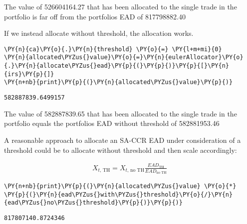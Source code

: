     The value of 526604164.27 that has been allocated to the single trade in
the portfolio is far off from the portfolios EAD of 817798882.40

    
    If we instead allocate without threshold, the allocation works.

    \begin{tcolorbox}[breakable, size=fbox, boxrule=1pt, pad at break*=1mm,colback=cellbackground, colframe=cellborder]
\begin{Verbatim}[commandchars=\\\{\}]
\PY{n}{ca}\PY{o}{.}\PY{n}{threshold} \PY{o}{=} \PY{l+m+mi}{0}
\PY{n}{allocated\PYZus{}value}\PY{o}{=}\PY{n}{eulerAllocator}\PY{o}{.}\PY{n}{allocate\PYZus{}ead}\PY{p}{(}\PY{p}{)}\PY{p}{[}\PY{n}{irs}\PY{p}{]}
\PY{n+nb}{print}\PY{p}{(}\PY{n}{allocated\PYZus{}value}\PY{p}{)}
\end{Verbatim}
\end{tcolorbox}

    \begin{Verbatim}[commandchars=\\\{\}]
582887839.6499157
    \end{Verbatim}

    The value of 582887839.65 that has been allocated to the single trade in
the portfolio equals the portfolios EAD without threshold of
582881953.46

    
    A reasonable approach to allocate an SA-CCR EAD under consideration of a
threshold could be to allocate without threshold and then scale
accordingly:

\begin{align}
\label{eq:C threshold scaling}
    X_{t\text{, TH}} = X_{t\text{, no TH}} \frac{EAD_{\text{TH}}}{EAD_{\text{no TH}}}
\end{align}

    \begin{tcolorbox}[breakable, size=fbox, boxrule=1pt, pad at break*=1mm,colback=cellbackground, colframe=cellborder]
\begin{Verbatim}[commandchars=\\\{\}]
\PY{n+nb}{print}\PY{p}{(}\PY{n}{allocated\PYZus{}value} \PY{o}{*} \PY{p}{(}\PY{n}{ead\PYZus{}with\PYZus{}threshold}\PY{o}{/}\PY{n}{ead\PYZus{}no\PYZus{}threshold}\PY{p}{)}\PY{p}{)}
\end{Verbatim}
\end{tcolorbox}

    \begin{Verbatim}[commandchars=\\\{\}]
817807140.8724346
    \end{Verbatim}

